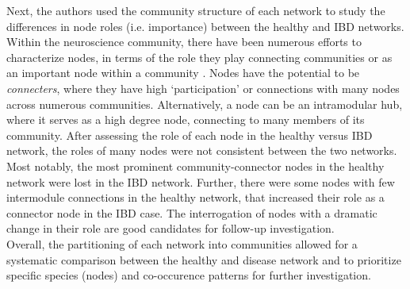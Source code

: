 \indent Next, the authors used the community structure of each network to study the differences in node roles (i.e. importance) between the healthy and IBD networks. Within the neuroscience community, there have been numerous efforts to characterize nodes, in terms of the role they play connecting communities or as an important node within a community \cite{hub}. Nodes have the potential to be \emph{connecters}, where they have high `participation' or connections with many nodes across numerous communities. Alternatively, a node can be an intramodular hub, where it serves as a high degree node, connecting to many members of its community. After assessing the role of each node in the healthy versus IBD network, the roles of many nodes were not consistent between the two networks. Most notably, the most prominent community-connector nodes in the healthy network were lost in the IBD network. Further, there were some nodes with few intermodule connections in the healthy network, that increased their role as a connector node in the IBD case. The interrogation of nodes with a dramatic change in their role are good candidates for follow-up investigation. \\
\indent Overall, the partitioning of each network into communities allowed for a systematic comparison between the healthy and disease network and to prioritize specific species (nodes) and co-occurence patterns for further investigation. 

